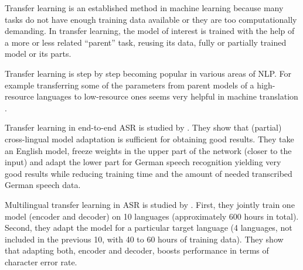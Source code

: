 Transfer learning  is an established method in machine learning because many tasks do not have enough training data available or they are too computationally demanding. In transfer learning, the model of interest is trained with the help of a more or less related ``parent'' task, reusing its data, fully or partially trained model or its parts.

Transfer learning is step by step becoming popular in various areas of NLP. 
For example transferring some of the parameters from parent models of a high-resource languages to low-resource ones seems very helpful in machine translation .

Transfer learning in end-to-end ASR is studied by  . They show that (partial) cross-lingual model adaptation is sufficient for obtaining good results. They take an English model, freeze weights in the upper part of the network (closer to the input) and adapt the lower part for German speech recognition yielding very good results while reducing training time and the amount of needed transcribed German speech data.



Multilingual transfer learning in ASR is studied by . First, they jointly train one model (encoder and decoder) on 10 languages (approximately 600 hours in total). Second, they adapt the model %
for a particular target language (4 languages, not included in the previous 10, with 40 to 60 hours of training data). They show that adapting both, encoder and decoder, boosts performance in terms of character error rate.

